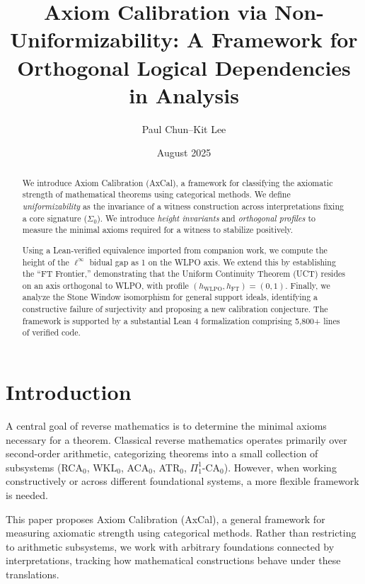 \documentclass[11pt]{article}
\title{Axiom Calibration via Non-Uniformizability: A Framework for Orthogonal Logical Dependencies in Analysis}
\author{Paul Chun--Kit Lee}
\date{August 2025}
\newcommand{\SigmaZero}{\Sigma_{0}}
\newcommand{\linf}{\ell^\infty}
\begin{document}
\maketitle

\begin{abstract}
We introduce Axiom Calibration (AxCal), a framework for classifying the axiomatic strength of mathematical theorems using categorical methods. We define \emph{uniformizability} as the invariance of a witness construction across interpretations fixing a core signature ($\SigmaZero$). We introduce \emph{height invariants} and \emph{orthogonal profiles} to measure the minimal axioms required for a witness to stabilize positively.

Using a Lean-verified equivalence imported from companion work, we compute the height of the $\linf$ bidual gap as 1 on the WLPO axis. We extend this by establishing the ``FT Frontier,'' demonstrating that the Uniform Continuity Theorem (UCT) resides on an axis orthogonal to WLPO, with profile $(h_{\text{WLPO}}, h_{\text{FT}}) = (0, 1)$. Finally, we analyze the Stone Window isomorphism for general support ideals, identifying a constructive failure of surjectivity and proposing a new calibration conjecture. The framework is supported by a substantial Lean 4 formalization comprising 5,800+ lines of verified code.
\end{abstract}

\tableofcontents

\section{Introduction}

A central goal of reverse mathematics is to determine the minimal axioms necessary for a theorem. Classical reverse mathematics operates primarily over second-order arithmetic, categorizing theorems into a small collection of subsystems (RCA$_0$, WKL$_0$, ACA$_0$, ATR$_0$, $\Pi^1_1$-CA$_0$). However, when working constructively or across different foundational systems, a more flexible framework is needed.

This paper proposes Axiom Calibration (AxCal), a general framework for measuring axiomatic strength using categorical methods. Rather than restricting to arithmetic subsystems, we work with arbitrary foundations connected by interpretations, tracking how mathematical constructions behave under these translations.
\end{document}
